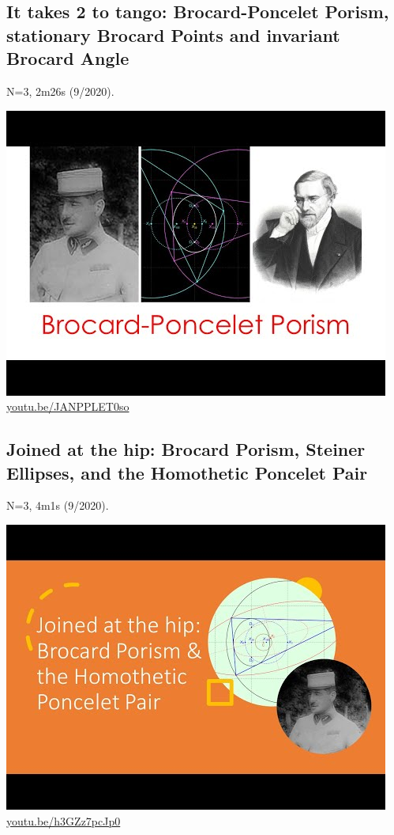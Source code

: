 \documentclass[12pt]{amsart}
\begin{document}
\subsection{It takes 2 to tango: Brocard-Poncelet Porism, stationary Brocard Points and invariant Brocard Angle}
\label{vid:JANPPLET0so}
\noindent N=3, 2m26s (9/2020). 
\begin{center}\includegraphics[width=.5\textwidth]{pics/JANPPLET0so.jpg} \\ 
\href{https://youtu.be/JANPPLET0so}{\url{youtu.be/JANPPLET0so}}\end{center}
% 

\subsection{Joined at the hip: Brocard Porism, Steiner Ellipses, and the Homothetic Poncelet Pair}
\label{vid:h3GZz7pcJp0}
\noindent N=3, 4m1s (9/2020). 
\begin{center}\includegraphics[width=.5\textwidth]{pics/h3GZz7pcJp0.jpg} \\ 
\href{https://youtu.be/h3GZz7pcJp0}{\url{youtu.be/h3GZz7pcJp0}}\end{center}
% 
\end{document}
